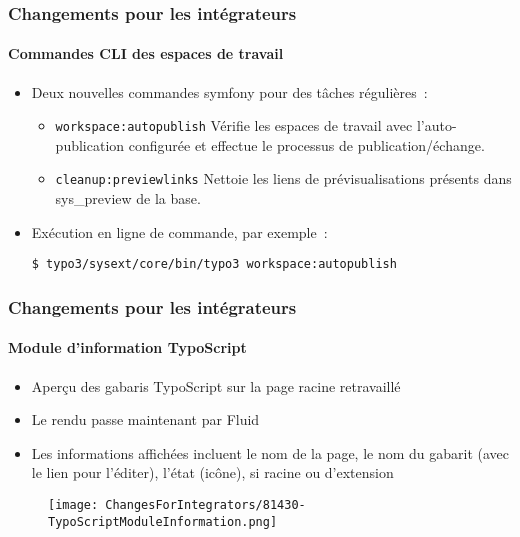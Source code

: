 
\begin{frame}[fragile]
	\frametitle{Changements pour les intégrateurs}
	\framesubtitle{Commandes CLI des espaces de travail}

	\lstset{basicstyle=\small\ttfamily}

	\begin{itemize}
		\item Deux nouvelles commandes symfony pour des tâches régulières~:

			\begin{itemize}

				\item \texttt{workspace:autopublish}\newline
					Vérifie les espaces de travail avec l'auto-publication
					configurée et effectue le processus de publication/échange.
					\newline

				\item \texttt{cleanup:previewlinks}\newline
					Nettoie les liens de prévisualisations présents
					dans sys\_preview de la base.

			\end{itemize}

		\item Exécution en ligne de commande, par exemple~:

			\begin{lstlisting}
$ typo3/sysext/core/bin/typo3 workspace:autopublish
			\end{lstlisting}

	\end{itemize}

\end{frame}


\begin{frame}[fragile]
	\frametitle{Changements pour les intégrateurs}
	\framesubtitle{Module d'information TypoScript}

	\begin{itemize}
		\item Aperçu des gabaris TypoScript sur la page racine retravaillé
		\item Le rendu passe maintenant par Fluid
		\item Les informations affichées incluent le nom de la page,
			le nom du gabarit (avec le lien pour l'éditer), l'état (icône),
			si racine ou d'extension

	\end{itemize}

	\begin{figure}
		\texttt{[image: ChangesForIntegrators/81430-TypoScriptModuleInformation.png]}
	\end{figure}

\end{frame}

